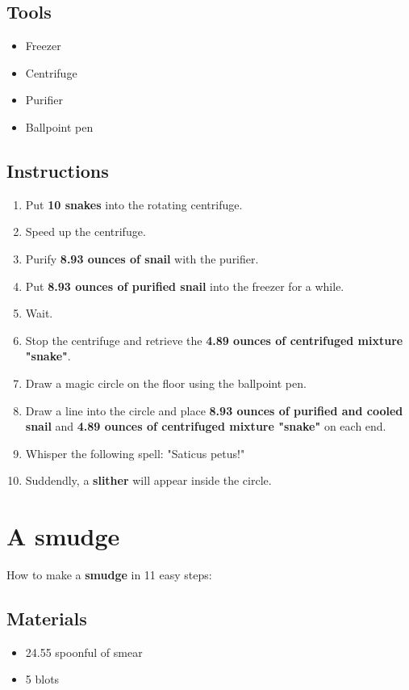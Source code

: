 \documentclass{article}
\begin{document}
\subsection{Tools}\begin{itemize}
\item 
Freezer
\item 
Centrifuge
\item 
Purifier
\item 
Ballpoint pen
\end{itemize}
\subsection{Instructions}\begin{enumerate}
\item 
Put \textbf{10 snakes} into the rotating centrifuge.
\item 
Speed up the centrifuge.
\item 
Purify \textbf{8.93 ounces of snail} with the purifier.
\item 
Put \textbf{8.93 ounces of purified snail} into the freezer for a while.
\item 
Wait.
\item 
Stop the centrifuge and retrieve the \textbf{4.89 ounces of centrifuged mixture "snake"}.
\item 
Draw a magic circle on the floor using the ballpoint pen.
\item 
Draw a line into the circle and place \textbf{8.93 ounces of purified and cooled snail} and \textbf{4.89 ounces of centrifuged mixture "snake"} on each end.
\item 
Whisper the following spell: "Saticus petus!"
\item 
Suddendly, a \textbf{slither} will appear inside the circle.
\end{enumerate}
\newpage
\section{A smudge}How to make a \textbf{smudge} in 11 easy steps:

\subsection{Materials}\begin{itemize}
\item 
24.55 spoonful of smear
\item 
5 blots
\end{itemize}
\end{document}

